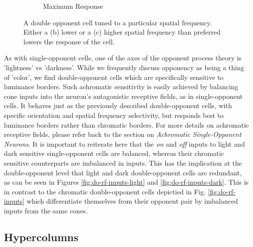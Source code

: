 \documentclass[journal,onecolumn]{IEEEtran}
\begin{document}
\begin{figure}[H]
\begin{subfigure}{0.2\textwidth}
        \caption{Maximum Response}
    \end{subfigure}%
    \caption{A double opponent cell tuned to a particular spatial frequency. Either a (b) lower or a (c) higher spatial frequency than preferred lowers the response of the cell.} \label{fig:do-scale}
\end{figure}

As with single-opponent cells, one of the axes of the opponent process theory is 'lightness' vs 'darkness'. While we frequently discuss opponency as being a thing of 'color', we find double-opponent cells which are specifically sensitive to luminance borders.
Such achromatic sensitivity is easily achieved by balancing cone inputs into the neuron's antagonistic receptive fields, as in single-opponent cells. It behaves just as the previously described double-opponent cells, with specific orientation and spatial frequency selectivity, but responds best to luminance borders rather than chromatic borders. For more details on achromatic receptive fields, please refer back to the section on \textit{Achromatic Single-Opponent Neurons}.
It is important to reiterate here that the \textit{on} and \textit{off} inputs to light and dark sensitive single-opponent cells are balanced, whereas their chromatic sensitive counterparts are imbalanced in inputs. This has the implication at the double-opponent level that light and dark double-opponent cells are redundant, as can be seen in Figures \ref{fig:do-rf-inputs-light} and \ref{fig:do-rf-inputs-dark}. This is in contrast to the chromatic double-opponent cells depictied in Fig. \ref{fig:do-rf-inputs} which differentiate themselves from their opponent pair by imbalanced inputs from the same cones.


\subsection*{Hypercolumns}
\end{document}
